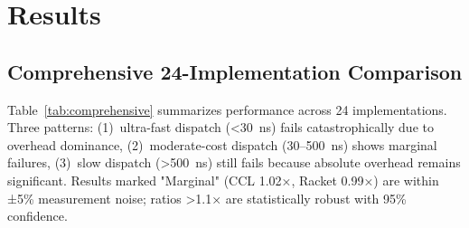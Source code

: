 \documentclass[sigplan,final,acmsmall,review,screen]{acmart}
\begin{document}
\section{Results}

\subsection{Comprehensive 24-Implementation Comparison}

Table~\ref{tab:comprehensive} summarizes performance across 24 implementations. Three patterns: (1)~ultra-fast dispatch (<30~ns) fails catastrophically due to overhead dominance, (2)~moderate-cost dispatch (30--500~ns) shows marginal failures, (3)~slow dispatch (>500~ns) still fails because absolute overhead remains significant. Results marked "Marginal" (CCL 1.02×, Racket 0.99×) are within ±5\% measurement noise; ratios >1.1× are statistically robust with 95\% confidence.
\end{document}
